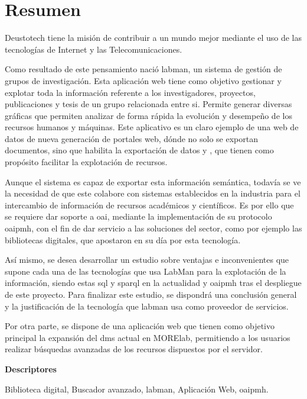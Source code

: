 \chapter*{Resumen}

Deustotech tiene la misión de contribuir a un mundo mejor mediante el uso de las tecnologías de Internet y las Telecomunicaciones.

Como resultado de este pensamiento nació \acrshort{labman}, un sistema de gestión de grupos de investigación. Esta aplicación web tiene como objetivo gestionar y explotar toda la información referente a los investigadores, proyectos, publicaciones y tesis de un grupo relacionada entre si. Permite generar diversas gráficas que permiten analizar de forma rápida la evolución y desempeño de los recursos humanos y máquinas.
Este aplicativo es un claro ejemplo de una web de datos de nueva generación de portales web, dónde
no solo se exportan documentos, sino que habilita la exportación de datos y , que
tienen como propósito facilitar la explotación de recursos.

Aunque el sistema es capaz de exportar esta información semántica, todavía se ve la necesidad de que este colabore con sistemas establecidos en la industria para el intercambio de información de recursos académicos y científicos.
Es por ello que se requiere dar soporte a \acrshort{oai}, mediante la implementación de su protocolo \acrshort{oaipmh}, con el fin de dar servicio a las soluciones del sector, como por ejemplo las bibliotecas digitales, que apostaron en su día por esta tecnología. 

Así mismo, se desea desarrollar un estudio sobre ventajas e inconvenientes que supone cada una de las tecnologías que usa LabMan para la explotación de la información, siendo estas \acrshort{sql} y \acrshort{sparql} en la actualidad y \acrshort{oaipmh} tras el despliegue de este proyecto. Para finalizar este estudio, se dispondrá una conclusión general y la justificación de la tecnología que \acrshort{labman} usa como proveedor de servicios.

Por otra parte, se dispone de una aplicación web que tienen como objetivo principal la expansión del \acrfull{dms} actual en MORElab, permitiendo a los usuarios realizar búsquedas avanzadas de los recursos dispuestos por el servidor.

\vspace{2em}

{\Large\bfseries\sffamily Descriptores}
\vspace{3\medskipamount}

Biblioteca digital, Buscador avanzado, \acrshort{labman}, Aplicación Web, \acrshort{oaipmh}.